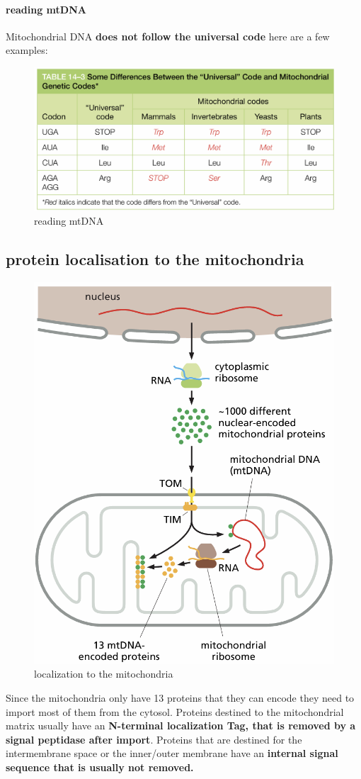 \documentclass[../main.tex]{subfiles}
\begin{document}
\paragraph{reading mtDNA}
Mitochondrial DNA \textbf{does not follow the universal code} here are a few examples:
\begin{figure}[H]
    \centering
    \includegraphics[width=\linewidth]{readingMtDNA.png}
    \caption{reading mtDNA}
    \label{fig:enter-label}
\end{figure}

\subsection{protein localisation to the mitochondria}
\begin{figure}[H]
    \centering
    \includegraphics[width=0.5\linewidth]{localization.png}
    \caption{localization to the mitochondria}
    \label{fig:enter-label}
\end{figure}
Since the mitochondria only have 13 proteins that they can encode they need to import most of them from the cytosol. Proteins destined to the mitochondrial matrix usually have an \textbf{N-terminal localization Tag, that is removed by a signal peptidase after import}. Proteins that are destined for the intermembrane space or the inner/outer membrane have an \textbf{internal signal sequence that is usually not removed.}
\end{document}
